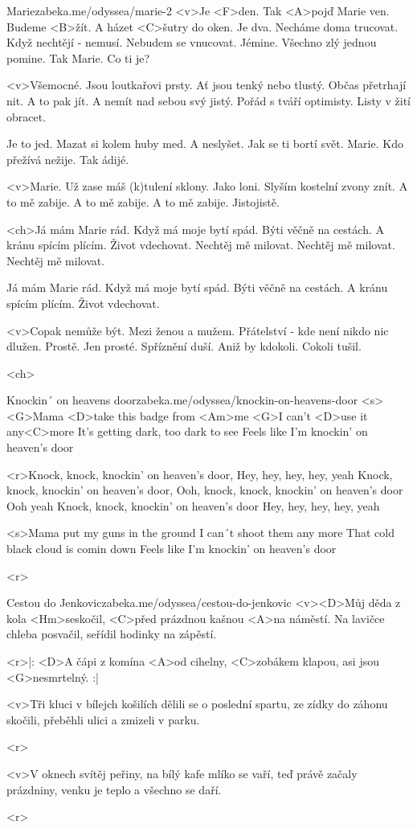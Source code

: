 \begin{song}{61}{Marie}{zabeka.me/odyssea/marie-2}
	<v>Je <F>den. Tak <A>pojď Marie ven.
	Budeme <B>žít. A házet <C>šutry do oken.
	Je dva. Necháme doma trucovat.
	Když nechtějí - nemusí. Nebudem se vnucovat.
	Jémine. Všechno zlý jednou pomine.
	Tak Marie. Co ti je?

	<v>Všemocné. Jsou loutkařovi prsty.
	Ať jsou tenký nebo tlustý. Občas přetrhají nit.
	A to pak jít. A nemít nad sebou svý jistý.
	Pořád s tváří optimisty. Listy v žití obracet.

	Je to jed. Mazat si kolem huby med.
	A neslyšet. Jak se ti bortí svět.
	Marie. Kdo přežívá nežije. Tak ádijé.

	<v>Marie. Už zase máš (k)tulení sklony.
	Jako loni. Slyším kostelní zvony znít.
	A to mě zabije. A to mě zabije.
	A to mě zabije. Jistojistě.

	<ch>Já mám Marie rád. Když má moje bytí spád.
	Býti věčně na cestách. A kránu spícím plícím.
	Život vdechovat. Nechtěj mě milovat.
	Nechtěj mě milovat. Nechtěj mě milovat.

	Já mám Marie rád. Když má moje bytí spád.
	Býti věčně na cestách. A kránu spícím plícím.
	Život vdechovat.

	<v>Copak nemůže být. Mezi ženou a mužem.
	Přátelství - kde není nikdo nic dlužen. Prostě.
	Jen prosté. Spříznění duší.
	Aniž by kdokoli. Cokoli tušil.

	<ch>

\end{song}
\begin{song}{62}{Knockin´ on heavens door}{zabeka.me/odyssea/knockin-on-heavens-door}
	<s><G>Mama <D>take this badge from <Am>me
	<G>I can't <D>use it any<C>more
	It's getting dark, too dark to see
	Feels like I'm knockin' on heaven's door

	<r>Knock, knock, knockin' on heaven's door,
	Hey, hey, hey, hey, yeah
	Knock, knock, knockin' on heaven's door,
	Ooh, knock, knock, knockin' on heaven's door
	Ooh yeah
	Knock, knock, knockin' on heaven's door
	Hey, hey, hey, hey, yeah

	<s>Mama put my guns in the ground
	I can´t shoot them any more
	That cold black cloud is comin down
	Feels like I'm knockin' on heaven's door

	<r>
\end{song}
\begin{song}[Radůza]{63}{Cestou do Jenkovic}{zabeka.me/odyssea/cestou-do-jenkovic}
	<v><D>Můj děda z kola <Hm>seskočil, <C>před prázdnou kašnou <A>na náměstí.
	Na lavičce chleba posvačil, seřídil hodinky na zápěstí.

	<r>|: <D>A čápi z komína <A>od cihelny, <C>zobákem klapou, asi jsou <G>nesmrtelný. :|

	<v>Tři kluci v bílejch košilích dělili se o poslední spartu,
	ze zídky do záhonu skočili, přeběhli ulici a zmizeli v parku.

	<r>

	<v>V oknech svítěj peřiny, na bílý kafe mlíko se vaří, teď právě začaly prázdniny, venku je teplo a všechno se daří.

	<r>
\end{song}
